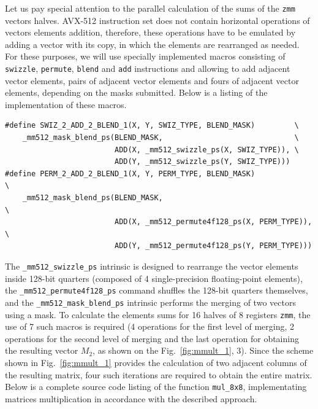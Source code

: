 \documentclass[
11pt,%
tightenlines,%
twoside,%
onecolumn,%
nofloats,%
nobibnotes,%
nofootinbib,%
superscriptaddress,%
noshowpacs,%
centertags]%
{revtex4}
\begin{document}
Let us pay special attention to the parallel calculation of the sums of the \texttt{zmm} vectors halves.
AVX-512 instruction set does not contain horizontal operations of vectors elements addition, therefore, these operations have to be emulated by adding a vector with its copy, in which the elements are rearranged as needed.
For these purposes, we will use specially implemented macros consisting of \texttt{swizzle}, \texttt{permute}, \texttt{blend} and \texttt{add} instructions and allowing to add adjacent vector elements, pairs of adjacent vector elements and fours of adjacent vector elements, depending on the masks submitted.
Below is a listing of the implementation of these macros.

\begin{lstlisting}
#define SWIZ_2_ADD_2_BLEND_1(X, Y, SWIZ_TYPE, BLEND_MASK)         \
    _mm512_mask_blend_ps(BLEND_MASK,                              \
                         ADD(X, _mm512_swizzle_ps(X, SWIZ_TYPE)), \
                         ADD(Y, _mm512_swizzle_ps(Y, SWIZ_TYPE)))
#define PERM_2_ADD_2_BLEND_1(X, Y, PERM_TYPE, BLEND_MASK)              \
    _mm512_mask_blend_ps(BLEND_MASK,                                   \
                         ADD(X, _mm512_permute4f128_ps(X, PERM_TYPE)), \
                         ADD(Y, _mm512_permute4f128_ps(Y, PERM_TYPE)))

\end{lstlisting}

The \texttt{\_mm512\_swizzle\_ps} intrinsic is designed to rearrange the vector elements inside 128-bit quarters (composed of 4 single-precision floating-point elements), the \texttt{\_mm512\_permute4f128\_ps} command shuffles the 128-bit quarters themselves, and the \texttt{\_mm512\_mask\_blend\_ps} intrinsic performs the merging of two vectors using a mask.
To calculate the elements sums for 16 halves of 8 registers \texttt{zmm}, the use of 7 such macros is required (4 operations for the first level of merging, 2 operations for the second level of merging and the last operation for obtaining the resulting vector $M_2$, as shown on the Fig.~\ref{fig:mmult_1}, 3).
Since the scheme shown in Fig.~\ref{fig:mmult_1} provides the calculation of two adjacent columns of the resulting matrix, four such iterations are required to obtain the entire matrix.
Below is a complete source code listing of the function \texttt{mul\_8x8}, implementating matrices multiplication in accordance with the described approach.
\end{document}
